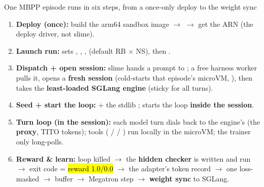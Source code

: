 \begin{frame}{One MBPP episode runs in six steps, from a once-only deploy to the weight sync}
\begin{enumerate}\footnotesize\setlength{\itemsep}{1.3mm}
\item \textbf{Deploy (once):} build the arm64 sandbox image $\rightarrow$  $\rightarrow$ get the ARN (the deploy driver, not slime).
\item \textbf{Launch run:}  sets , , ,  (default RB $\times$ NS), then .
\item \textbf{Dispatch + open session:} slime hands a prompt to ; a free harness worker pulls it, opens a \textbf{fresh session} (cold-starts that episode's microVM, ), then takes the \textbf{least-loaded SGLang engine} (sticky for all turns).
\item \textbf{Seed + start the loop:}   + the stdlib ;  starts the  loop \textbf{inside the session}.
\item \textbf{Turn loop (in the session):} each model turn dials back to the engine's  (the \textbf{proxy}, TITO tokens); tools ( /  / ) run locally in the microVM; the trainer only long-polls.
\item \textbf{Reward \& learn:} loop killed $\rightarrow$ the \textbf{hidden checker} is written and run $\rightarrow$ exit code = \hl{reward 1.0/0.0} $\rightarrow$ the adapter's token record $\rightarrow$ one loss-masked  $\rightarrow$ buffer $\rightarrow$ Megatron step $\rightarrow$ \textbf{weight sync} to SGLang.
\end{enumerate}
\end{frame}

